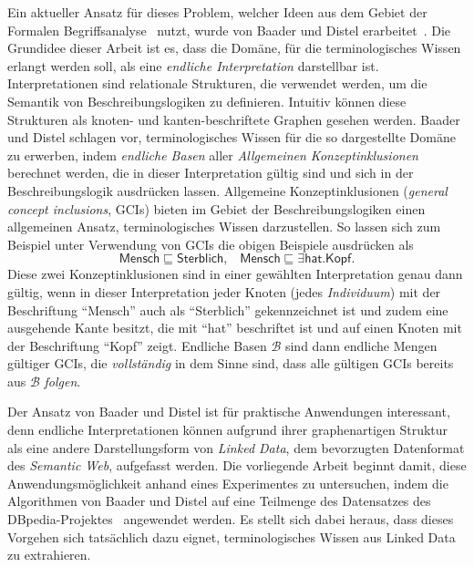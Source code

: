 \documentclass[ngerman,fleqn,DIV=12]{scrartcl}
\begin{document}
Ein aktueller Ansatz für dieses Problem, welcher Ideen aus dem Gebiet der Formalen
Begriffsanalyse~\cite{fca-book} nutzt, wurde von Baader und Distel
erarbeitet~\cite{Diss-Felix}.  Die Grundidee dieser Arbeit ist es, dass die Domäne, für
die terminologisches Wissen erlangt werden soll, als eine \emph{endliche Interpretation}
darstellbar ist.  Interpretationen sind relationale Strukturen, die verwendet werden, um
die Semantik von Beschreibungslogiken zu definieren.  Intuitiv können diese Strukturen als
knoten- und kanten-beschriftete Graphen gesehen werden.  Baader und Distel schlagen vor,
terminologisches Wissen für die so dargestellte Domäne zu erwerben, indem \emph{endliche
  Basen} aller \emph{Allgemeinen Konzeptinklusionen} berechnet werden, die in dieser
Interpretation gültig sind und sich in der Beschreibungslogik \ELbot ausdrücken lassen.
Allgemeine Konzeptinklusionen (\emph{general concept inclusions}, GCIs) bieten im Gebiet
der Beschreibungslogiken einen allgemeinen Ansatz, terminologisches Wissen darzustellen.
So lassen sich zum Beispiel unter Verwendung von GCIs die obigen Beispiele ausdrücken als
\begin{equation*}
  \mathsf{Mensch} \sqsubseteq \mathsf{Sterblich}, \;\;\; \mathsf{Mensch} \sqsubseteq \exists
  \mathsf{hat}. \mathsf{Kopf}.
\end{equation*}
Diese zwei Konzeptinklusionen sind in einer gewählten Interpretation genau dann gültig,
wenn in dieser Interpretation jeder Knoten (jedes \emph{Individuum}) mit der Beschriftung
\enquote{\textsf{Mensch}} auch als \enquote{\textsf{Sterblich}} gekennzeichnet ist und
zudem eine ausgehende Kante besitzt, die mit \enquote{\textsf{hat}} beschriftet ist und
auf einen Knoten mit der Beschriftung \enquote{\textsf{Kopf}} zeigt.  Endliche Basen
$\mathcal{B}$ sind dann endliche Mengen gültiger GCIs, die \emph{vollständig} in dem Sinne
sind, dass alle gültigen GCIs bereits aus $\mathcal{B}$ \emph{folgen}.

Der Ansatz von Baader und Distel ist für praktische Anwendungen interessant, denn endliche
Interpretationen können aufgrund ihrer graphenartigen Struktur als eine andere
Darstellungsform von \emph{Linked Data}, dem bevorzugten Datenformat des \emph{Semantic
  Web}, aufgefasst werden.  Die vorliegende Arbeit beginnt damit, diese
Anwendungsmöglichkeit anhand eines Experimentes zu untersuchen, indem die Algorithmen von
Baader und Distel auf eine Teilmenge des Datensatzes des DBpedia-Projektes~\cite{DBpedia}
angewendet werden.  Es stellt sich dabei heraus, dass dieses Vorgehen sich tatsächlich
dazu eignet, terminologisches Wissen aus Linked Data zu extrahieren.
\end{document}
